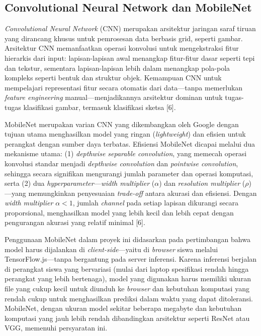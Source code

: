 \documentclass[12pt,oneside]{report}
\begin{document}
\subsection{Convolutional Neural Network dan MobileNet}
\label{subsec:cnn-mobilenet}

\textit{Convolutional Neural Network} (CNN) merupakan arsitektur jaringan saraf tiruan yang dirancang khusus untuk pemrosesan data berbasis grid, seperti gambar. Arsitektur CNN memanfaatkan operasi konvolusi untuk mengekstraksi fitur hierarkis dari input: lapisan-lapisan awal menangkap fitur-fitur dasar seperti tepi dan tekstur, sementara lapisan-lapisan lebih dalam menangkap pola-pola kompleks seperti bentuk dan struktur objek. Kemampuan CNN untuk mempelajari representasi fitur secara otomatis dari data—tanpa memerlukan \textit{feature engineering} manual—menjadikannya arsitektur dominan untuk tugas-tugas klasifikasi gambar, termasuk klasifikasi sketsa [6].

MobileNet merupakan varian CNN yang dikembangkan oleh Google dengan tujuan utama menghasilkan model yang ringan (\textit{lightweight}) dan efisien untuk perangkat dengan sumber daya terbatas. Efisiensi MobileNet dicapai melalui dua mekanisme utama: (1) \textit{depthwise separable convolution}, yang memecah operasi konvolusi standar menjadi \textit{depthwise convolution} dan \textit{pointwise convolution}, sehingga secara signifikan mengurangi jumlah parameter dan operasi komputasi, serta (2) dua \textit{hyperparameter}—\textit{width multiplier} ($\alpha$) dan \textit{resolution multiplier} ($\rho$)—yang memungkinkan penyesuaian \textit{trade-off} antara akurasi dan efisiensi. Dengan \textit{width multiplier} $\alpha < 1$, jumlah \textit{channel} pada setiap lapisan dikurangi secara proporsional, menghasilkan model yang lebih kecil dan lebih cepat dengan pengurangan akurasi yang relatif minimal [6].

Penggunaan MobileNet dalam proyek ini didasarkan pada pertimbangan bahwa model harus dijalankan di \textit{client-side}—yaitu di \textit{browser} siswa melalui TensorFlow.js—tanpa bergantung pada server inferensi. Karena inferensi berjalan di perangkat siswa yang bervariasi (mulai dari laptop spesifikasi rendah hingga perangkat yang lebih bertenaga), model yang digunakan harus memiliki ukuran file yang cukup kecil untuk diunduh ke \textit{browser} dan kebutuhan komputasi yang rendah cukup untuk menghasilkan prediksi dalam waktu yang dapat ditoleransi. MobileNet, dengan ukuran model sekitar beberapa megabyte dan kebutuhan komputasi yang jauh lebih rendah dibandingkan arsitektur seperti ResNet atau VGG, memenuhi persyaratan ini.
\end{document}
